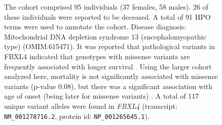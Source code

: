 \begin{figure}[htbp]
\caption{The cohort comprised 95 individuals (37 females, 58 males). 26 of these individuals were reported to be deceased. 
A total of 91 HPO terms were used to annotate the cohort. Disease diagnosis: Mitochondrial DNA depletion syndrome 13 (encephalomyopathic type)
 (OMIM:615471). It was reported that  pathological variants in FBXL4 indicated that genotypes with 
 missense variants are frequently associated with longer survival \cite{PMID_28940506}. 
 Using the larger cohort analyzed here, mortality is not significantly associated with 
 missense variants (p-value 0.08), but there was a significant association with age of onset (being later for missense variants) \cite{PMID_28940506}.
 A total of 117 unique variant alleles were found in \textit{FBXL4} (transcript: \texttt{NM\_001278716.2}, protein id: \texttt{NP\_001265645.1}).}
\end{figure}
